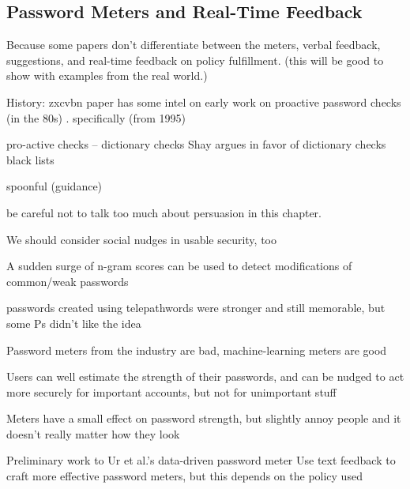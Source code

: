 	\subsection{Password Meters and Real-Time Feedback}
	
	 Because some papers don't differentiate between the meters, verbal feedback, suggestions, and real-time feedback on policy fulfillment. (this will be good to show with examples from the real world.)
	
	
	
	History: zxcvbn paper has some intel on early work on proactive password checks (in the 80s) \cite{Wheeler2016zxcvbn}. specifically (from 1995) \cite{Bishop1995ProactivePasswordChecking}
	
	
	pro-active checks -- dictionary checks Shay argues in favor of dictionary checks \cite{Shay2014CanLongPasswordsBeSecureAndUsable} 
	black lists \cite{Habib2017Blacklists} 
	
	spoonful (guidance) \cite{Shay2015SpoonfulOfSugar}
	\cite{Forget2008ImprovingPasswordsThroughPersuasion}
	
	be careful not to talk too much about persuasion in this chapter. 
	
	We should consider social nudges in usable security, too \cite{DiGioia2005SocialNavigationUsableSecurity}
	
	
	A sudden surge of n-gram scores can be used to detect modifications of common/weak passwords \cite{Tupsamudre2016MarkovStrength}
	
	
	passwords created using telepathwords were stronger and still memorable, but some Ps didn't like the idea \cite{Komanduri2014Telepathwords}
	
	Password meters from the industry are bad, machine-learning meters are good \cite{Wang2016fuzzyPWM}
	
	Users can well estimate the strength of their passwords, and can be nudged to act more securely for important accounts, but not for unimportant stuff \cite{Egelman2013DoesMyPasswordGoUpToEleven}
	
	Meters have a small effect on password strength, but slightly annoy people and it doesn't really matter how they look \cite{Ur2012HowDoesYourPasswordMeasureUp}
	
	Preliminary work to Ur et al.'s data-driven password meter \cite{Eargle2015YouCanDoBetter}
	Use text feedback to craft more effective password meters, but this depends on the policy used \cite{Ur2017DataDrivenPWMeter}
	
